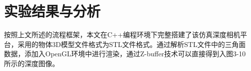 \newpage

\section{实验结果与分析}

按照上文所述的流程框架，本文在C++编程环境下完整搭建了该仿真深度相机平台，采用的物体3D模型文件格式为STL文件格式。通过解析STL文件中的三角面数据，添加入OpenGL环境中进行渲染，通过Z-buffer技术可以直接得到入图3-10所示的深度图像。
\begin{figure}[htb]
\end{figure}
